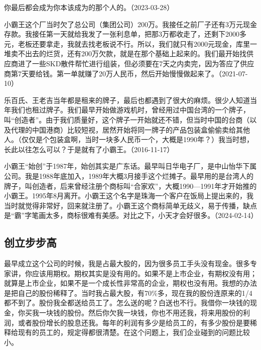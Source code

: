 
你最后都会成为你本该成为的那个人的。（2023-03-28）

小霸王这个厂当时欠了总公司（集团公司）200万。我接任之前厂子还有3万元现金存款。我接任第一天就给我发了一张利息单，把那3万都收走了，还剩下2000多元，老板还要拿走，我就去找老板说不行。所以，我们就只有2000元现金，库里一堆卖不出去的烂货，还有200万欠款，就是在那个基础上起来的。我们最开始找供应商进了一些SKD散件帮忙进行组装，但必须要在7天之内卖完，因为答应了供应商第7天要给钱。第一单就赚了20万人民币，然后开始慢慢做起来了。（2021-07-10）

乐百氏、王老吉当年都是租来的牌子，最后也都遇到了很大的麻烦。很少人知道当年我们也租过牌子。我们最早开始做游戏机时，曾经用过中国台湾的一个牌子，叫“创造者”。由于我们质量好，这个牌子一开始就还不错，但当时中国的台商（以及代理的中国港商）比较短视，居然开始将同一牌子的产品包装盒偷偷卖给其他人。（仅仅是个包装盒啊，当时一块多人民币一个，大概是1990年？）我当时想，长此以往怎么可以？于是就有了小霸王。（2016-11-17）

小霸王“始创”于1987年，始创其实是广东话。最早叫日华电子厂，是中山怡华下属公司。我是1988年底加入，1989年大概3月接手这个烂摊子。最早用的是台湾人的牌子，叫创造者，后来曾经注册个商标叫“合家欢”，大概1990—1991年才开始推的小霸王。1995年8月离开。小霸王这个名字是珠海一个客户在饭局上提出来的，我当时就觉得非常好，回来就注册了。小霸王这个商标简单无歧义，易于传播，缺点是“霸”字笔画太多，商标很难有美感。对比之下，小天才会好很多。（2024-02-14）

\subsection{创立步步高}


最早成立这个公司的时候，我是占最大股的，因为很多员工手头没有现金。很多专家讲，你应该用期权。期权其实是没有用的。如果不是上市企业，有期权没有用；就算是上市企业，如果不是一个成长性非常高的企业，期权也没有用。我想的办法是把自己的股份稀释了。当时我占最大股，有70\%多，现在我的股份连原来的1/4都不到了。股份我全都送给员工了。怎么送的呢？白送也不行。我借你一块钱的现金，你买我一块钱的股份。然后你欠我一块钱，你也不用还我，将来用股份的利润，或者股份增长的股息还我。每年的利润有多少是给员工的，有多少股份是要稀释给现有的员工的，规定得都很清楚。在这个问题上，我们企业碰到的问题比较小。

